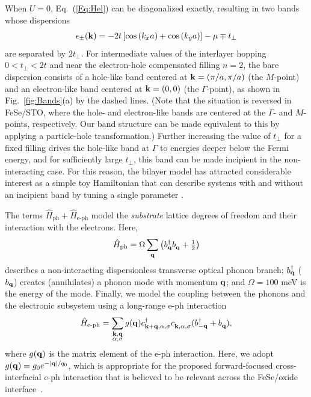\documentclass[%
 reprint,
 superscriptaddress,
nofootinbib,
nobibnotes,
 amsmath,amssymb,
 aps,
 prb,
 dvipsnames, 
 floatfix
]{revtex4-2}
\newcommand{\eph}{e-ph}
\newcommand{\pdag}{{\phantom\dagger}}
\begin{document}
When $U = 0$, Eq.~(\ref{Eq:Hel}) can be diagonalized exactly, 
resulting in two bands whose dispersions  
\begin{equation*}
    \epsilon_\pm({\bf k}) = -2t\left[\cos\left(k_xa\right)+\cos\left(k_y a\right)\right]-\mu\mp t_\perp
\end{equation*} 
are separated by $2t_\perp$. 
For intermediate values of the interlayer hopping $0 < t_\perp < 2t$ and near the electron-hole compensated filling $n=2$, the bare dispersion consists of a hole-like band centered at ${\bf k} = (\pi/a,\pi/a)$ (the $M$-point) and an electron-like band centered at ${\bf k} = (0,0)$ (the $\Gamma$-point), 
as shown in Fig.~\ref{fig:Bands}(a) by the dashed lines. (Note that the situation is 
reversed in FeSe/STO, where the hole- and electron-like bands are centered at the $\Gamma$- and $M$-points, respectively. Our band structure can be made equivalent to this by 
applying a 
particle-hole transformation.) Further increasing the value of $t_\perp$ for a fixed filling 
drives the hole-like band at $\Gamma$ to energies deeper below the Fermi energy, and for sufficiently large $t_\perp$, this band can be made incipient in the non-interacting case.  For this reason, the bilayer model has attracted considerable interest as a simple toy Hamiltonian that can describe systems with and without an incipient band by tuning a single parameter \cite{PhysRevB.66.184508,PhysRevB.72.212509,PhysRevB.77.144527,Maier:2011gp,Mishra2016,Matsumoto2020,PhysRevResearch.2.023156,PhysRevB.99.140504}. 

The terms $\hat{H}_{\text{ph}} + \hat{H}_{\text{\eph}}$ model the \emph{substrate}
lattice degrees of freedom and their interaction with the electrons. Here,   
\begin{equation}
    \hat{H}_{\mathrm{ph}} = \Omega \sum_{{\bf q}} \left(b^\dagger_{{\bf q} }b^{\phantom\dagger}_{\bf q}+\tfrac{1}{2}\right)
\end{equation}
describes a non-interacting dispersionless transverse optical phonon branch;  
$b^\dagger_{\bf q}$ ($b^{\pdag}_{\bf q}$) creates (annihilates) a phonon mode with momentum ${\bf q}$; 
and $\Omega = 100$ meV is the energy of the mode. Finally, we model the coupling between the phonons and the electronic subsystem using a long-range {\eph} interaction 
\begin{equation}
     \hat{H}_{\text{\eph}} = 
        \sum_{\substack{{\bf k}, {\bf q}\\\alpha, \sigma}} g({\bf q})
        c^\dagger_{{\bf k}+ {\bf q},\alpha,\sigma}
        c^{\phantom\dagger}_{{\bf k},\alpha,\sigma} 
        (b^\dagger_{-{\bf q}} + b^{\phantom\dagger}_{\bf q}), 
\end{equation}
where $g({\bf q})$ is the matrix element of the {\eph} interaction. 
Here, we adopt $g({\bf q}) = g_0 e^{- |{\bf q}|/q_0}$, which is appropriate 
for the proposed forward-focused cross-interfacial {\eph} interaction that is believed 
to be relevant across the FeSe/oxide interface~\cite{Lee2014,Rademaker2016,WangSUST}. 
\end{document}
